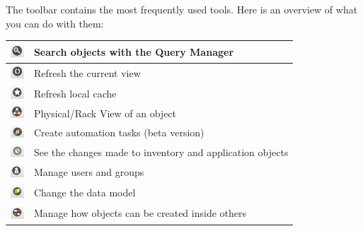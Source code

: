 \documentclass[a4paper]{article}
\begin{document}
	The toolbar contains the most frequently used tools. Here is an overview of what you can do with them:
	\begin{table}[h!]
		\centering
		\begin{tabular}{cl}
			\includegraphics[width=0.5cm]{img/icon_query_manager.png} & Search objects with the Query Manager\\
			\midrule
			\includegraphics[width=0.5cm]{img/icon_refresh_component.png} & Refresh the current view\\
			\midrule
			\includegraphics[width=0.5cm]{img/icon_refresh_cache.png} & Refresh local cache\\
			\midrule
			\includegraphics[width=0.5cm]{img/icon_object_view.png} & Physical/Rack View of an object\\
			\midrule
			\includegraphics[width=0.5cm]{img/icon_task_manager.png} & Create automation tasks (beta version)\\
			\midrule
			\includegraphics[width=0.5cm]{img/icon_audit_trail.png} & See the changes made to inventory and application objects\\
			\midrule
			\includegraphics[width=0.5cm]{img/icon_user_manager.png} & Manage users and groups\\
			\midrule
			\includegraphics[width=0.5cm]{img/icon_data_model_manager.png} & Change the data model\\
			\midrule
			\includegraphics[width=0.5cm]{img/icon_containment_manager.png} & Manage how objects can be created inside others\\

\end{tabular}
\end{table}
\end{document}
